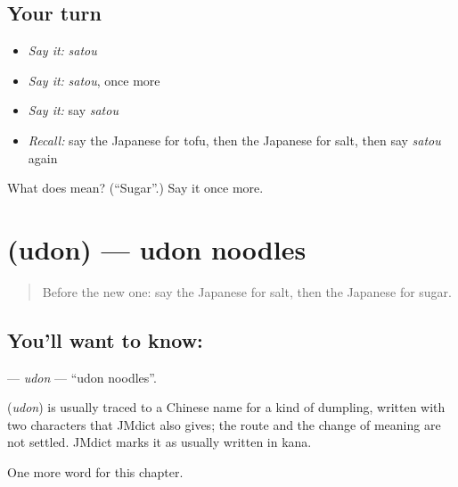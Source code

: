 \subsection*{Your turn}
\begin{itemize}
\raggedright
  \item \emph{Say it:} \emph{satou}
  \item \emph{Say it:} \emph{satou}, once more
  \item \emph{Say it:} say \emph{satou}
  \item \emph{Recall:} say the Japanese for tofu, then the Japanese for salt, then say \emph{satou} again
\end{itemize}

\begin{tcolorbox}[breakable,colback=teal!4,colframe=teal!35!black,title={Before you move on}]
What does  mean? (\textquotedblleft{}Sugar\textquotedblright{}.) Say it once more.
\end{tcolorbox}
\section[\texorpdfstring{\ja{うどん} (udon)}{うどん (udon)}]{ (udon) — udon noodles}

\label{lesson:JA-C35-udon}



\begin{quote}
Before the new one: say the Japanese for salt, then the Japanese for sugar.
\end{quote}

\subsection*{You'll want to know: }
\textbf{} — \emph{udon} — \textquotedblleft{}udon noodles\textquotedblright{}.

\begin{cousinweb}
\textbf{} (\emph{udon}) is usually traced to a Chinese name for a kind of dumpling, written with two characters that JMdict also gives; the route and the change of meaning are not settled. JMdict marks it as usually written in kana.
\end{cousinweb}

\begin{grammarlens}[title={What you've built}]
One more word for this chapter.
\end{grammarlens}

